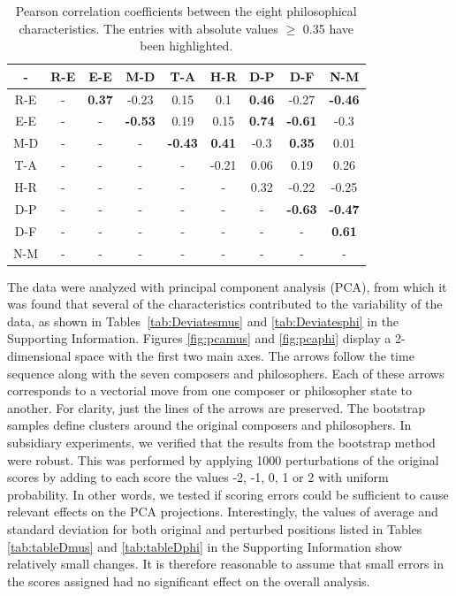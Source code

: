\documentclass[
 aip,
 jmp,
 amsmath,amssymb,
 reprint,
]{revtex4-1}
\begin{document}
\begin{table}\footnotesize
  \caption{\label{tab:tableBphi}Pearson correlation coefficients
    between the eight philosophical characteristics.  The entries with
    absolute values $\geq$ 0.35 have been highlighted.}
  \begin{ruledtabular}
    \begin{tabular}{|c||c|c|c|c|c|c|c|c|}
      - & R-E & E-E & M-D & T-A & H-R & D-P & D-F & N-M \\ \hline
      R-E & - & \bf{0.37} & -0.23 & 0.15 & 0.1 & \bf{0.46} & -0.27 & \bf{-0.46} 
      \\
      E-E & - & - & \bf{-0.53} & 0.19 & 0.15 & \bf{0.74} & \bf{-0.61} & -0.3 
      \\
      M-D & - & - & - & \bf{-0.43} & \bf{0.41} & -0.3 & \bf{0.35} & 0.01 
      \\
      T-A & - & - & - & - & -0.21 & 0.06  & 0.19 & 0.26 
      \\
      H-R & - & - & - & - & - & 0.32 & -0.22 & -0.25 
      \\ 
      D-P & - & - & - & - & - & - & \bf{-0.63} & \bf{-0.47} 
      \\
      D-F & - & - & - & - & - & - & - & \bf{0.61}
      \\
      N-M & - & - & - & - & - & - & - & - 
      \\
    \end{tabular}
  \end{ruledtabular}
\end{table}


The data were analyzed with principal component analysis (PCA), from
which it was found that several of the characteristics contributed to
the variability of the data, as shown in Tables~\ref{tab:Deviatesmus}
and \ref{tab:Deviatesphi} in the Supporting Information. Figures
\ref{fig:pcamus} and \ref{fig:pcaphi} display a 2-dimensional space
with the first two main axes. The arrows follow the time sequence
along with the seven composers and philosophers. Each of these arrows
corresponds to a vectorial move from one composer or philosopher state
to another. For clarity, just the lines of the arrows are
preserved. The bootstrap samples define clusters around the original
composers and philosophers. In subsidiary experiments, we verified
that the results from the bootstrap method were robust. This was
performed by applying 1000 perturbations of the original scores by
adding to each score the values -2, -1, 0, 1 or 2 with uniform
probability. In other words, we tested if scoring errors could be
sufficient to cause relevant effects on the PCA
projections. Interestingly, the values of average and standard
deviation for both original and perturbed positions listed in Tables
\ref{tab:tableDmus} and \ref{tab:tableDphi} in the Supporting
Information show relatively small changes. It is therefore reasonable
to assume that small errors in the scores assigned had no significant
effect on the overall analysis.
\end{document}
